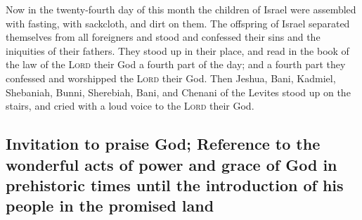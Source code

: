  Now in the twenty-fourth day of this month the children
of Israel were assembled with fasting, with sackcloth, and dirt on them.
 The offspring of Israel separated themselves from all
foreigners and stood and confessed their sins and the iniquities of
their fathers.  They stood up in their place, and read in
the book of the law of the \textsc{Lord} their God a fourth part of the
day; and a fourth part they confessed and worshipped the \textsc{Lord}
their God.  Then Jeshua, Bani, Kadmiel, Shebaniah, Bunni,
Sherebiah, Bani, and Chenani of the Levites stood up on the stairs, and
cried with a loud voice to the \textsc{Lord} their God.

\hypertarget{invitation-to-praise-god-reference-to-the-wonderful-acts-of-power-and-grace-of-god-in-prehistoric-times-until-the-introduction-of-his-people-in-the-promised-land}{%
\subsection{Invitation to praise God; Reference to the wonderful acts of
power and grace of God in prehistoric times until the introduction of
his people in the promised
land}\label{invitation-to-praise-god-reference-to-the-wonderful-acts-of-power-and-grace-of-god-in-prehistoric-times-until-the-introduction-of-his-people-in-the-promised-land}}

